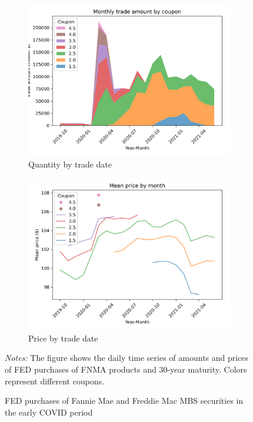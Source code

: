 \documentclass[11pt,a4paper]{article}
\begin{document}
\begin{figure}[h]
    \centering
    \begin{subfigure}[b]{0.49\textwidth}
      \includegraphics[width=0.998\textwidth]{../results/figures/fed_monthly_trade_amount_by_coupon.png}
      \caption{ Quantity by trade date}
     \end{subfigure}
     \begin{subfigure}[b]{0.49\textwidth}
      \includegraphics[width=0.998\textwidth]{../results/figures/fed_monthly_price_mean_by_coupon.png}
      \caption{ Price by trade date}
     \end{subfigure}
     \caption{FED purchases of Fannie Mae and Freddie Mac MBS securities  in the early COVID period} 
     \begin{minipage}{\textwidth}
        \footnotesize{\textit{Notes:} The figure shows the daily time series of amounts and prices of FED purchases of FNMA products and 30-year maturity. Colors represent different coupons. } 
        \end{minipage}
\end{figure}
\end{document}
